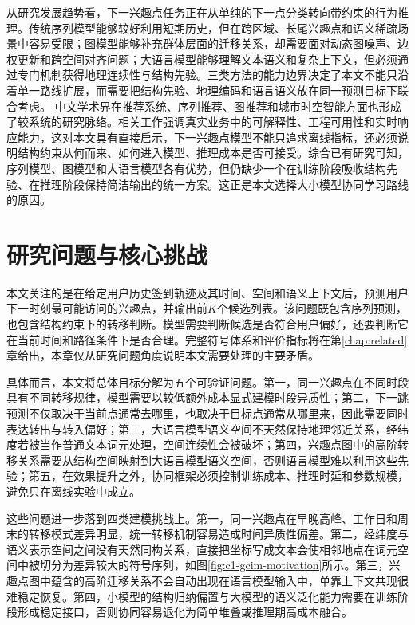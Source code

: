 从研究发展趋势看，下一兴趣点任务正在从单纯的下一点分类转向带约束的行为推理。传统序列模型能够较好利用短期历史，但在跨区域、长尾兴趣点和语义稀疏场景中容易受限；图模型能够补充群体层面的迁移关系，却需要面对动态图噪声、边权更新和跨空间对齐问题；大语言模型能够理解文本语义和复杂上下文，但必须通过专门机制获得地理连续性与结构先验。三类方法的能力边界决定了本文不能只沿着单一路线扩展，而需要把结构先验、地理编码和语言语义放在同一预测目标下联合考虑。
中文学术界在推荐系统、序列推荐、图推荐和城市时空智能方面也形成了较系统的研究脉络\cite{liu2024cn1,zhang2023cn2,wang2023cn3,li2024cn4,zhao2022cn5,he2021cn6,sun2022cn7,yang2023cn8}。相关工作强调真实业务中的可解释性、工程可用性和实时响应能力\cite{chen2024cn9,gao2024cn10,huang2024cn11,xu2024cn12,qian2024cn15}，这对本文具有直接启示，下一兴趣点模型不能只追求离线指标，还必须说明结构约束从何而来、如何进入模型、推理成本是否可接受。综合已有研究可知，序列模型、图模型和大语言模型各有优势，但仍缺少一个在训练阶段吸收结构先验、在推理阶段保持简洁输出的统一方案。这正是本文选择大小模型协同学习路线的原因。

\section{研究问题与核心挑战}
本文关注的是在给定用户历史签到轨迹及其时间、空间和语义上下文后，预测用户下一时刻最可能访问的兴趣点，并输出前$K$个候选列表。该问题既包含序列预测，也包含结构约束下的转移判断。模型需要判断候选是否符合用户偏好，还要判断它在当前时间和路径条件下是否合理。完整符号体系和评价指标将在第\ref{chap:related}章给出，本章仅从研究问题角度说明本文需要处理的主要矛盾。

具体而言，本文将总体目标分解为五个可验证问题。第一，同一兴趣点在不同时段具有不同转移规律，模型需要以较低额外成本显式建模时段异质性；第二，下一跳预测不仅取决于当前点通常去哪里，也取决于目标点通常从哪里来，因此需要同时表达转出与转入偏好；第三，大语言模型语义空间不天然保持地理邻近关系，经纬度若被当作普通文本词元处理，空间连续性会被破坏；第四，兴趣点图中的高阶转移关系需要从结构空间映射到大语言模型语义空间，否则语言模型难以利用这些先验；第五，在效果提升之外，协同框架必须控制训练成本、推理时延和参数规模，避免只在离线实验中成立。

这些问题进一步落到四类建模挑战上。第一，同一兴趣点在早晚高峰、工作日和周末的转移模式差异明显，统一转移机制容易造成时间异质性偏差\cite{ST-RNN,zhao2019stgn,STAN,STiSAN,MTNet}。第二，经纬度与语义表示空间之间没有天然同构关系，直接把坐标写成文本会使相邻地点在词元空间中被切分为差异较大的符号序列\cite{GeoSAN,li2020gcnpoi,LLM4POI,Jonathan2023Gpt}，如图\ref{fig:c1-gcim-motivation}所示。第三，兴趣点图中蕴含的高阶迁移关系不会自动出现在语言模型输入中，单靠上下文共现很难稳定恢复\cite{GraphFlashback,SNPM,STHGCN,SeCor,STKG-PLM}。第四，小模型的结构归纳偏置与大模型的语义泛化能力需要在训练阶段形成稳定接口，否则协同容易退化为简单堆叠或推理期高成本融合\cite{ReLLa,CoRAL,xu2024hybridrec,wu2024ragrec,qu2024onerecthink}。

